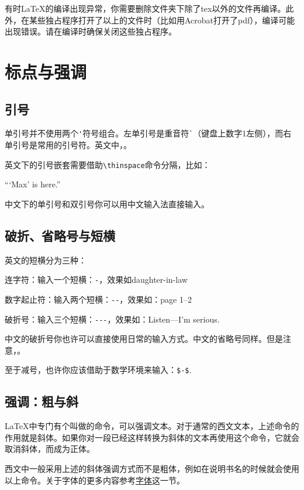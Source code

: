 {有时\LaTeX 的编译出现异常，你需要删除文件夹下除了tex以外的文件再编译。此外，在某些独占程序打开了以上的文件时（比如用Acrobat打开了pdf），编译可能出现错误。请在编译时确保关闭这些独占程序。

\section{标点与强调}
\subsection{引号}
单引号并不使用两个\verb|'|符号组合。左单引号是重音符\verb|`|（键盘上数字1左侧），而右单引号是常用的引号符。英文中，。

英文下的引号嵌套需要借助\verb|\thinspace|命令分隔，比如：

\begin{codeshow}
``\thinspace`Max' is here.''
\end{codeshow}

中文下的单引号和双引号你可以用中文输入法直接输入。

\subsection{破折、省略号与短横}
英文的短横分为三种：
\begin{feai}
\item 连字符：输入一个短横：\verb|-|，效果如daughter-in-law
\item 数字起止符：输入两个短横：\verb|--|，效果如：page 1--2
\item 破折号：输入三个短横：\verb|---|，效果如：Listen---I'm serious.
\end{feai}

中文的破折号你也许可以直接使用日常的输入方式。中文的省略号同样。但是注意，。

至于减号，也许你应该借助于数学环境来输入：\verb|$-$|.

\subsection{强调：粗与斜}
\LaTeX 中专门有个叫做的命令，可以强调文本。对于通常的西文文本，上述命令的作用就是斜体。如果你对一段已经这样转换为斜体的文本再使用这个命令，它就会取消斜体，而成为正体。

西文中一般采用上述的斜体强调方式而不是粗体，例如在说明书名的时候就会使用以上命令。关于字体的更多内容参考\hyperref[sec:font]{字体}这一节。

}
